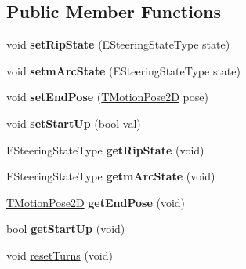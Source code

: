 \subsection*{Public Member Functions}
\begin{DoxyCompactItemize}
\item 
\mbox{\label{classmotion_1_1CActionTurns_addce21ae0ea9f2b2eb7fb8691b629887}} 
void {\bfseries set\+Rip\+State} (E\+Steering\+State\+Type state)
\item 
\mbox{\label{classmotion_1_1CActionTurns_a4c239e99437ea5b6cb24b0fc9087419a}} 
void {\bfseries setm\+Arc\+State} (E\+Steering\+State\+Type state)
\item 
\mbox{\label{classmotion_1_1CActionTurns_a1d09823d239aba059b052b70a4a10e4c}} 
void {\bfseries set\+End\+Pose} (\mbox{\hyperlink{structmotion_1_1TMotionPose2D}{T\+Motion\+Pose2D}} pose)
\item 
\mbox{\label{classmotion_1_1CActionTurns_ae98c255a39b0990bd3997f3ce168c948}} 
void {\bfseries set\+Start\+Up} (bool val)
\item 
\mbox{\label{classmotion_1_1CActionTurns_a3e043171f2901edf0516fe15ee12533e}} 
E\+Steering\+State\+Type {\bfseries get\+Rip\+State} (void)
\item 
\mbox{\label{classmotion_1_1CActionTurns_aea392699f5314246bc8a34645f73b8a2}} 
E\+Steering\+State\+Type {\bfseries getm\+Arc\+State} (void)
\item 
\mbox{\label{classmotion_1_1CActionTurns_a4b7e70f438a5466d8a8c6bc607b614a0}} 
\mbox{\hyperlink{structmotion_1_1TMotionPose2D}{T\+Motion\+Pose2D}} {\bfseries get\+End\+Pose} (void)
\item 
\mbox{\label{classmotion_1_1CActionTurns_add3fcaedf84b796f1afbd4f42a60ffab}} 
bool {\bfseries get\+Start\+Up} (void)
\item 
void \mbox{\hyperlink{classmotion_1_1CActionTurns_aee91baac598ada2ef32e9ad25142c58c}{reset\+Turns}} (void)
\item 

\end{DoxyCompactItemize}
